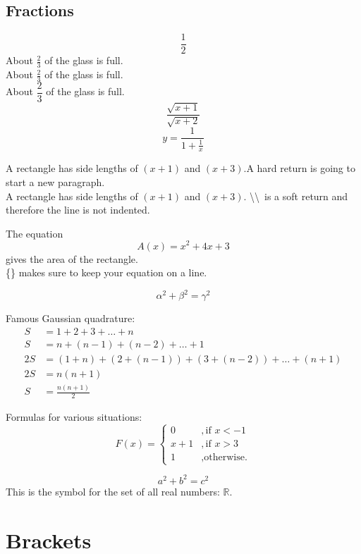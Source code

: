 \documentclass[12pt, a4paper]{article}
\begin{document}
\subsection{Fractions}
$$\frac{1}{2}$$
About $\displaystyle \frac{2}{3}$ of the glass is full.\\[12pt]
About $\frac{2}{3}$ of the glass is full.\\[6pt]
About $\dfrac{2}{3}$ of the glass is full.
$$\frac{\sqrt{x+1}}{\sqrt{x+2}}$$
$$y=\frac{1}{  1+\frac{1}{x}  }$$

A rectangle has side lengths of $(x+1)$ and $(x+3)$.A hard return is going to start a new paragraph.\\
A rectangle has side lengths of $(x+1)$ and $(x+3)$. \textbackslash\textbackslash\ is a soft return and therefore the line is not indented.

The equation $${A(x)=x^2+4x+3}$$ gives the area of the rectangle.\\
\{\} makes sure to keep your equation on a line.\cite{trevisanato2000tea}

\begin{equation}\label{eq0}
    \alpha^2+\beta^2=\gamma^2
\end{equation}

Famous Gaussian quadrature:
\begin{equation*}
    \begin{split}
        S&=1+2+3+\dots+n\\
        S&=n+(n-1)+(n-2)+\dots+1\\
        2S&=(1+n)+(2+(n-1))+(3+(n-2))+\dots+(n+1)\\
        2S&=n(n+1)\\
        S&=\frac{n(n+1)}{2} 
    \end{split}
\end{equation*}

Formulas for various situations:
\begin{equation}
    F(x)=
    \begin{cases}
        0&,\text{if $x<-1$}\\
        x+1&,\text{if $x>3$}\\
        1&,\text{otherwise.}
    \end{cases}
\end{equation}

\[
    a^2+b^2=c^2
\]
This is the symbol for the set of all real numbers: $\mathbb{R}$.

\section{Brackets}
\end{document}
